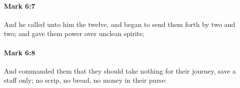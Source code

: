 		\paragraph{Mark 6:7} %
			\label{MARK-6-7}

			And he called unto him the twelve, and began to send them forth by two and two; and gave them power over unclean spirits;

			\begin{framed}
			\scriptsize
				\begin{compactdesc}
					\item[SBLG]  \hyperref[EXOUSIA]{} 
				\end{compactdesc}
			\end{framed}

		\paragraph{Mark 6:8} %
			\label{MARK-6-8}

			And commanded them that they should take nothing for their journey, save a staff only; no scrip, no bread, no money in their purse:

